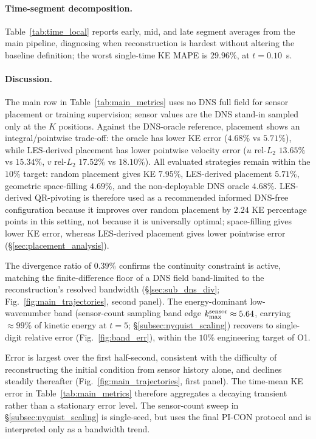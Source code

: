 \paragraph{Time-segment decomposition.}
Table~\ref{tab:time_local} reports early, mid, and late segment averages from the main pipeline, diagnosing when reconstruction is hardest without altering the baseline definition; the worst single-time KE MAPE is $29.96\%$, at $t = 0.10$~s.

\paragraph{Discussion.}
The main row in Table~\ref{tab:main_metrics} uses no DNS full field for sensor placement or training supervision; sensor values are the DNS stand-in sampled only at the $K$ positions. Against the DNS-oracle reference, placement shows an integral/pointwise trade-off: the oracle has lower KE error ($4.68\%$ vs $5.71\%$), while LES-derived placement has lower pointwise velocity error ($u$ rel-$L_2$ $13.65\%$ vs $15.34\%$, $v$ rel-$L_2$ $17.52\%$ vs $18.10\%$). All evaluated strategies remain within the $10\%$ target: random placement gives KE $7.95\%$, LES-derived placement $5.71\%$, geometric space-filling $4.69\%$, and the non-deployable DNS oracle $4.68\%$. LES-derived QR-pivoting is therefore used as a recommended informed DNS-free configuration because it improves over random placement by $2.24$ KE percentage points in this setting, not because it is universally optimal; space-filling gives lower KE error, whereas LES-derived placement gives lower pointwise error (\S\ref{sec:placement_analysis}).

The divergence ratio of $0.39\%$ confirms the continuity constraint is active, matching the finite-difference floor of a DNS field band-limited to the reconstruction's resolved bandwidth (\S\ref{sec:sub_dns_div}; Fig.~\ref{fig:main_trajectories}, second panel). The energy-dominant low-wavenumber band (sensor-count sampling band edge $k_{\max}^{\rm sensor}\approx 5.64$, carrying $\approx 99\%$ of kinetic energy at $t=5$; \S\ref{subsec:nyquist_scaling}) recovers to single-digit relative error (Fig.~\ref{fig:band_err}), within the $10\%$ engineering target of O1.

Error is largest over the first half-second, consistent with the difficulty of reconstructing the initial condition from sensor history alone, and declines steadily thereafter (Fig.~\ref{fig:main_trajectories}, first panel). The time-mean KE error in Table~\ref{tab:main_metrics} therefore aggregates a decaying transient rather than a stationary error level. The sensor-count sweep in \S\ref{subsec:nyquist_scaling} is single-seed, but uses the final PI-CON protocol and is interpreted only as a bandwidth trend.

